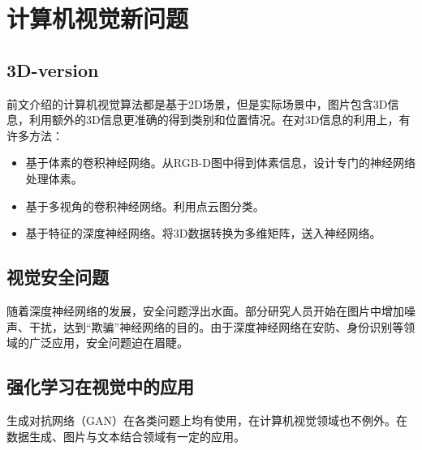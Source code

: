\section{计算机视觉新问题}

\subsection{3D-version}
前文介绍的计算机视觉算法都是基于2D场景，但是实际场景中，图片包含3D信息，利用额外的3D信息更准确的得到类别和位置情况。在对3D信息的利用上，有许多方法：
\begin{itemize}
\item 基于体素的卷积神经网络。从RGB-D图中得到体素信息，设计专门的神经网络处理体素。
\item 基于多视角的卷积神经网络。利用点云图分类。
\item 基于特征的深度神经网络。将3D数据转换为多维矩阵，送入神经网络。
\end{itemize}

\subsection{视觉安全问题}
随着深度神经网络的发展，安全问题浮出水面。部分研究人员开始在图片中增加噪声、干扰，达到“欺骗”神经网络的目的。由于深度神经网络在安防、身份识别等领域的广泛应用，安全问题迫在眉睫。

\subsection{强化学习在视觉中的应用}
生成对抗网络（GAN）在各类问题上均有使用，在计算机视觉领域\cite{mao2017least,mirza2014conditional,berthelot2017began,bousmalis2017unsupervised,isola2017image}也不例外。在数据生成、图片与文本结合领域有一定的应用。
